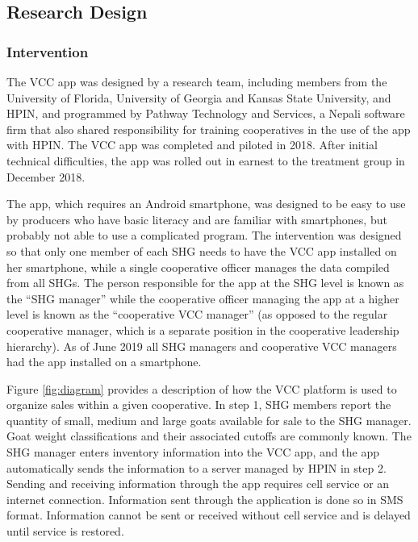 \documentclass[11pt]{article}
\begin{document}
\subsection{Research Design} \label{sec:E3_research.design}
\subsubsection{Intervention} \label{sec:E3_intervention}
The VCC app was designed by a research team, including members from the University of Florida, University of Georgia and Kansas State University, and HPIN, and programmed by Pathway Technology and Services, a Nepali software firm that also shared responsibility for training cooperatives in the use of the app with HPIN. The VCC app was completed and piloted in 2018. After initial technical difficulties, the app was rolled out in earnest to the treatment group in December 2018.  

The app, which requires an Android smartphone, was designed to be easy to use by producers who have basic literacy and are familiar with smartphones, but probably not able to use a complicated program. The intervention was designed so that only one member of each SHG needs to have the VCC app installed on her smartphone, while a single cooperative officer manages the data compiled from all SHGs. The person responsible for the app at the SHG level is known as the ``SHG manager'' while the cooperative officer managing the app at a higher level is known as the ``cooperative VCC manager'' (as opposed to the regular cooperative manager, which is a separate position in the cooperative leadership hierarchy). As of June 2019 all SHG managers and cooperative VCC managers had the app installed on a smartphone.

Figure \ref{fig:diagram} provides a description of how the VCC platform is used to organize sales within a given cooperative. In step 1, SHG members report the quantity of small, medium and large goats available for sale to the SHG manager. Goat weight classifications and their associated cutoffs are commonly known. The SHG manager enters inventory information into the VCC app, and the app automatically sends the information to a server managed by HPIN in step 2. Sending and receiving information through the app requires cell service or an internet connection. Information sent through the application is done so in SMS format. Information cannot be sent or received without cell service and is delayed until service is restored.
\end{document}
